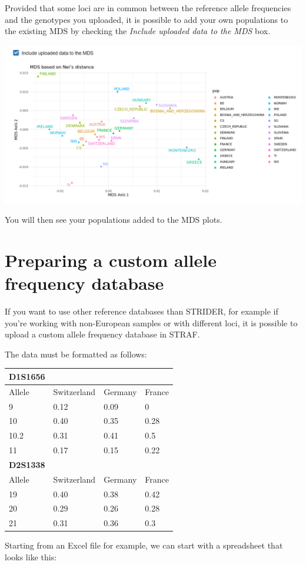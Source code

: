 \documentclass[
]{book}
\begin{document}
Provided that some loci are in common between the reference allele frequencies and
the genotypes you uploaded, it is possible to add your own populations to the existing MDS
by checking the \emph{Include uploaded data to the MDS} box.

\includegraphics[width=1\linewidth]{img/capture_ref_pop_3}

You will then see your populations added to the MDS plots.

\hypertarget{preparing-a-custom-allele-frequency-database}{%
\section{Preparing a custom allele frequency database}\label{preparing-a-custom-allele-frequency-database}}

If you want to use other reference databases than STRIDER, for example if you're working with
non-European samples or with different loci, it is possible to upload a custom
allele frequency database in STRAF.

The data must be formatted as follows:

\begin{longtable}[]{@{}llll@{}}
\toprule
D1S1656 & & &\tabularnewline
\midrule
\endhead
Allele & Switzerland & Germany & France\tabularnewline
9 & 0.12 & 0.09 & 0\tabularnewline
10 & 0.40 & 0.35 & 0.28\tabularnewline
10.2 & 0.31 & 0.41 & 0.5\tabularnewline
11 & 0.17 & 0.15 & 0.22\tabularnewline
\textbf{D2S1338} & & &\tabularnewline
Allele & Switzerland & Germany & France\tabularnewline
19 & 0.40 & 0.38 & 0.42\tabularnewline
20 & 0.29 & 0.26 & 0.28\tabularnewline
21 & 0.31 & 0.36 & 0.3\tabularnewline
\bottomrule
\end{longtable}

Starting from an Excel file for example, we can start with a spreadsheet that looks
like this:
\end{document}
